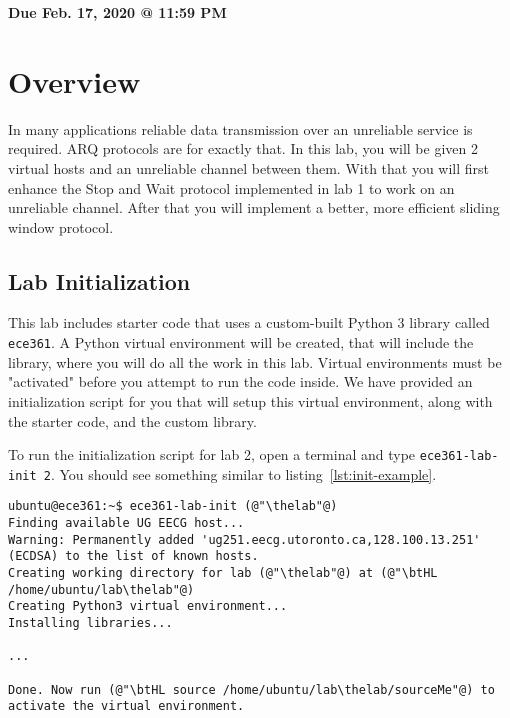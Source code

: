 \documentclass[11pt]{article}
\makeatletter
\def\thelab{2}
\def\datedue{Feb. 17, 2020 @ 11:59 PM}
\makeatother
\begin{document}
\maketitle \thispagestyle{fancy}
\hfill {\large \textbf{Due \datedue}}


\section{Overview}
\label{sec:overview}
In many applications reliable data transmission over an unreliable service is required. ARQ protocols are for exactly that. In this lab, you will be given 2 virtual hosts and an unreliable channel between them. With that you will first enhance the Stop and Wait protocol implemented in lab 1 to work on an unreliable channel. After that you will implement a better, more efficient sliding window protocol.

\subsection{Lab Initialization}
\label{subsec:lab-init}
This lab includes starter code that uses a custom-built Python 3 library called \texttt{ece361}. A Python virtual environment will be created, that will include the library, where you will do all the work in this lab. Virtual environments must be "activated" before you attempt to run the code inside. We have provided an initialization script for you that will setup this virtual environment, along with the starter code, and the custom library.


To run the initialization script for lab \thelab, open a terminal and type \texttt{ece361-lab-init \thelab}. You should see something similar to listing~\ref{lst:init-example}.
\begin{lstlisting}[style=ece361shell, caption={Initializing lab \thelab.}, label={lst:init-example}]
ubuntu@ece361:~$ ece361-lab-init (@"\thelab"@)
Finding available UG EECG host...
Warning: Permanently added 'ug251.eecg.utoronto.ca,128.100.13.251' (ECDSA) to the list of known hosts.
Creating working directory for lab (@"\thelab"@) at (@"\btHL /home/ubuntu/lab\thelab"@)
Creating Python3 virtual environment...
Installing libraries...

...

Done. Now run (@"\btHL source /home/ubuntu/lab\thelab/sourceMe"@) to activate the virtual environment.
\end{lstlisting}
\end{document}
